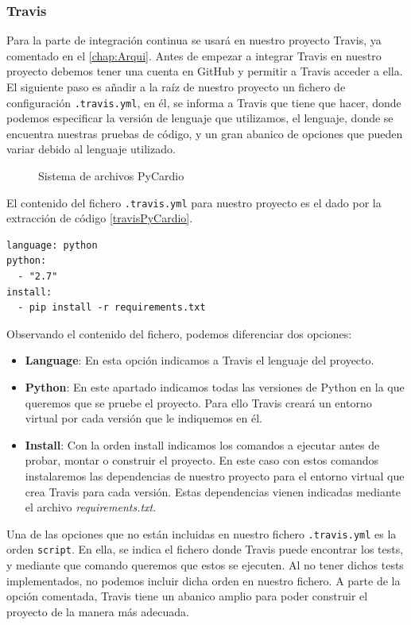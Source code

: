 \subsubsection*{Travis}
\label{subsubsec:Travis}
Para la parte de integración continua se usará en nuestro proyecto Travis, ya comentado en el \ref{chap:Arqui}. Antes de empezar a integrar Travis en nuestro proyecto debemos tener una cuenta en GitHub y permitir a Travis acceder a ella. El siguiente paso es añadir a la raíz de nuestro proyecto un fichero de configuración \texttt{.travis.yml}, en él, se informa a Travis que tiene que hacer, donde podemos especificar la versión de lenguaje que utilizamos, el lenguaje, donde se encuentra nuestras pruebas de código, y un gran abanico de opciones que pueden variar debido al lenguaje utilizado. \\

\begin{figure}[h]
\centering
{}
\caption{Sistema de archivos PyCardio}
\label{fig:travisDir}
\end{figure}
El contenido del fichero \texttt{.travis.yml} para nuestro proyecto es el dado por la extracción de código \ref{travisPyCardio}. 
\begin{lstlisting}[caption={\texttt{.travis.yml} de PyCardio},label=travisPyCardio]
language: python
python:
  - "2.7"
install:
  - pip install -r requirements.txt
\end{lstlisting}
Observando el contenido del fichero, podemos diferenciar dos opciones:
\begin{itemize}
    \item \textbf{Language}: En esta opción indicamos a Travis el lenguaje del proyecto.
    \item \textbf{Python}: En este apartado indicamos todas las versiones de Python en la que queremos que se pruebe el proyecto. Para ello Travis creará un entorno virtual por cada versión que le indiquemos en él.
    \item \textbf{Install}: Con la orden install indicamos los comandos a ejecutar antes de probar, montar o construir el proyecto. En este caso con estos comandos instalaremos las dependencias de nuestro proyecto para el entorno virtual que crea Travis para cada versión. Estas dependencias vienen indicadas mediante el archivo \textit{requirements.txt}. 
\end{itemize}
Una de las opciones que no están incluidas en nuestro fichero \texttt{.travis.yml} es la orden \texttt{script}. En ella, se indica el fichero donde Travis puede encontrar los tests, y mediante que comando queremos que estos se ejecuten. Al no tener dichos tests implementados, no podemos incluir dicha orden en nuestro fichero. A parte de la opción comentada, Travis tiene un abanico amplio para poder construir el proyecto de la manera más adecuada.

